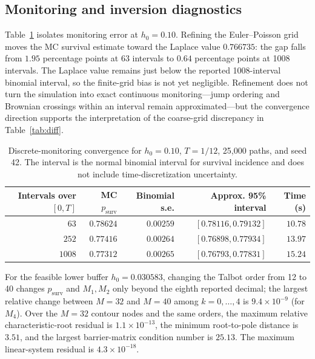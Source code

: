 \subsection{Monitoring and inversion diagnostics}

Table~\ref{tab:mc-convergence} isolates monitoring error at $h_0=0.10$. Refining the
Euler--Poisson grid moves the MC survival estimate toward the Laplace value
$0.766735$: the gap falls from $1.95$ percentage points at 63 intervals to $0.64$
percentage points at 1008 intervals. The Laplace value remains just below the reported
1008-interval binomial interval, so the finite-grid bias is not yet negligible. Refinement
does not turn the simulation into exact continuous monitoring---jump ordering and Brownian
crossings within an interval remain approximated---but the convergence direction supports
the interpretation of the coarse-grid discrepancy in Table~\ref{tab:diff}.

\begin{table}[ht]
\centering\small
\renewcommand{\arraystretch}{1.25}
\begin{tabular}{rrrrr}
\toprule
Intervals over $[0,T]$ & MC $p_{\mathrm{surv}}$ & Binomial s.e. & Approx. 95\% interval & Time (s) \\
\midrule
$63$   & $0.78624$ & $0.00259$ & $[0.78116,0.79132]$ & $10.78$ \\
$252$  & $0.77416$ & $0.00264$ & $[0.76898,0.77934]$ & $13.97$ \\
$1008$ & $0.77312$ & $0.00265$ & $[0.76793,0.77831]$ & $15.24$ \\
\bottomrule
\end{tabular}
\caption{Discrete-monitoring convergence for $h_0=0.10$, $T=1/12$, 25,000 paths,
and seed 42. The interval is the normal binomial interval for survival incidence and does
not include time-discretization uncertainty.}
\label{tab:mc-convergence}
\end{table}

For the feasible lower buffer $h_0=0.030583$, changing the Talbot order from 12 to 40
changes $p_{\mathrm{surv}}$ and $M_1,M_2$ only beyond the eighth reported decimal; the
largest relative change between $M=32$ and $M=40$ among $k=0,\ldots,4$ is
$9.4\times10^{-9}$ (for $M_4$). Over the $M=32$ contour nodes and the same orders, the
maximum relative characteristic-root residual is $1.1\times10^{-13}$, the minimum
root-to-pole distance is $3.51$, and the largest barrier-matrix condition number is $25.13$.
The maximum linear-system residual is $4.3\times10^{-18}$.

